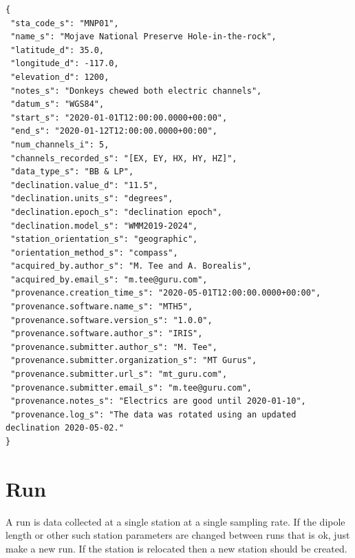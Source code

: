 \documentclass{article}
\begin{document}
\begin{verbatim}
{
 "sta_code_s": "MNP01",
 "name_s": "Mojave National Preserve Hole-in-the-rock",
 "latitude_d": 35.0,
 "longitude_d": -117.0,
 "elevation_d": 1200,
 "notes_s": "Donkeys chewed both electric channels",
 "datum_s": "WGS84",
 "start_s": "2020-01-01T12:00:00.0000+00:00",
 "end_s": "2020-01-12T12:00:00.0000+00:00",
 "num_channels_i": 5,
 "channels_recorded_s": "[EX, EY, HX, HY, HZ]",
 "data_type_s": "BB & LP",
 "declination.value_d": "11.5",
 "declination.units_s": "degrees",
 "declination.epoch_s": "declination epoch",
 "declination.model_s": "WMM2019-2024",
 "station_orientation_s": "geographic",
 "orientation_method_s": "compass",
 "acquired_by.author_s": "M. Tee and A. Borealis",
 "acquired_by.email_s": "m.tee@guru.com",
 "provenance.creation_time_s": "2020-05-01T12:00:00.0000+00:00",
 "provenance.software.name_s": "MTH5",
 "provenance.software.version_s": "1.0.0",
 "provenance.software.author_s": "IRIS",
 "provenance.submitter.author_s": "M. Tee",
 "provenance.submitter.organization_s": "MT Gurus",
 "provenance.submitter.url_s": "mt_guru.com",
 "provenance.submitter.email_s": "m.tee@guru.com",
 "provenance.notes_s": "Electrics are good until 2020-01-10",
 "provenance.log_s": "The data was rotated using an updated declination 2020-05-02."
}
\end{verbatim}

\newpage
\section{Run}

A run is data collected at a single station at a single sampling rate.  If the dipole length or other such station parameters are changed between runs that is ok, just make a new run.  If the station is relocated then a new station should be created.
\end{document}
